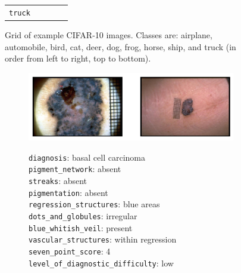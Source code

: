 \documentclass[../ShajiS_RnDReport.tex]{subfiles}
\begin{document}
\begin{figure}[ht]
\begin{tabular}{ccccc}
\begin{minipage}[b]{0.15\linewidth}
            \centering\scriptsize\texttt{truck}
        \end{minipage}
    \end{tabular}
    \caption{Grid of example CIFAR-10 images. Classes are: airplane, automobile, bird, cat, deer, dog, frog, horse, ship, and truck (in order from left to right, top to bottom).}
    \label{fig:grid_images}
\end{figure}

\begin{figure}[ht]
    \centering
    \begin{subfigure}[b]{0.8\linewidth}
        \centering
        \includegraphics[width=\linewidth]{figures/derm7pt-images/derm_01.png}
        \vspace{0.25em}
        \raggedright
        \footnotesize\texttt{diagnosis}: basal cell carcinoma\\
        \footnotesize\texttt{pigment\_network}: absent\\
        \footnotesize\texttt{streaks}: absent\\
        \footnotesize\texttt{pigmentation}: absent\\
        \footnotesize\texttt{regression\_structures}: blue areas\\
        \footnotesize\texttt{dots\_and\_globules}: irregular\\
        \footnotesize\texttt{blue\_whitish\_veil}: present\\
        \footnotesize\texttt{vascular\_structures}: within regression\\
        \vspace{0.25em}
        \footnotesize\texttt{seven\_point\_score}: 4\\
        \footnotesize\texttt{level\_of\_diagnostic\_difficulty}: low
        \label{fig:first_image}
    \end{subfigure}
    
    \vspace{1em}
    

\end{figure}
\end{document}
